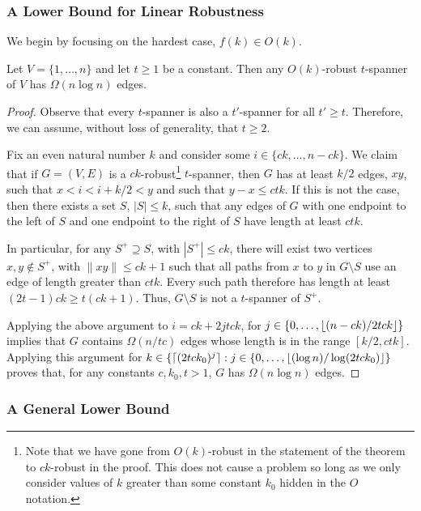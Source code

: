 \documentclass{patmorin}
\begin{document}
\subsubsection{A Lower Bound for Linear Robustness}

We begin by focusing on the hardest case, $f(k) \in O(k)$.

\begin{thm}
  Let $V=\{1,\ldots,n\}$ and let $t\ge 1$ be a constant.  Then any
  $O(k)$-robust $t$-spanner of $V$ has $\Omega(n\log n)$ edges.
\end{thm}

\begin{proof}
  Observe that every $t$-spanner is also a $t'$-spanner for all $t'\ge t$.
  Therefore, we can assume, without loss of generality, that $t\ge 2$.

  Fix an even natural number $k$ and consider some
  $i\in\{ck,\ldots,n-ck\}$.  We claim that if $G=(V,E)$ is a
  $ck$-robust\footnote{Note that we have gone from $O(k)$-robust in the
  statement of the theorem to $ck$-robust in the proof.  This does not
  cause a problem so long as we only consider values of $k$ greater
  than some constant $k_0$ hidden in the $O$ notation.} $t$-spanner,
  then $G$ has at least $k/2$ edges, $xy$, such that $x < i < i+k/2 <
  y$ and such that $y-x \le ctk$.  If this is not the case, then there
  exists a set $S$, $|S|\le k$, such that any edges of $G$ with one
  endpoint to the left of $S$ and one endpoint to the right of $S$
  have length at least $ctk$.

  In particular, for any $S^+\supseteq S$, with $|S^+|\le ck$, there will
  exist two vertices $x,y\not\in S^+$, with $\|xy\|\le ck+1$ such that all
  paths from $x$ to $y$ in $G\setminus S$ use an edge of length greater
  than $ctk$. Every such path therefore has length at least $(2t-1)ck\ge
  t(ck+1)$.  Thus, $G\setminus S$ is not a $t$-spanner of $S^+$.

  Applying the above argument to $i=ck+2jtck$, for
  $j\in\{0,\ldots,{\lfloor (n-ck)/2tck \rfloor}\}$ implies that $G$ contains
  $\Omega(n/tc)$ edges whose length is in the range $[k/2,ctk]$.
  Applying this argument for $k\in\{{\lceil (2tck_0)^{j} \rceil} :
  j\in\{0,\ldots,{\lfloor (\log n)/\log(2tck_0) \rfloor}\}$ proves that, for any
  constants $c,k_0,t>1$, $G$ has $\Omega(n\log n)$ edges.
\end{proof}


\subsubsection{A General Lower Bound}
\end{document}

